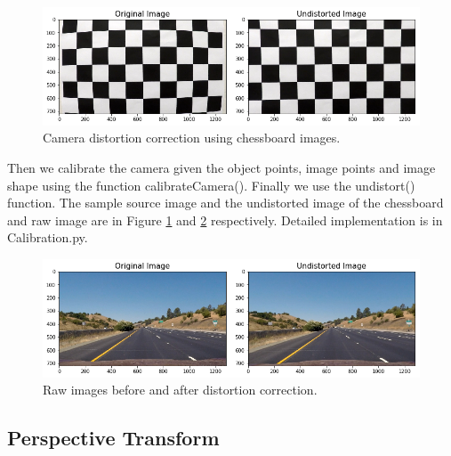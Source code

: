 \documentclass[12pt,twoside]{article}
\begin{document}
\begin{figure}[H]
	\begin{center}
		\includegraphics[width = 1.0\hsize]{./figures/Calibration.png} 
		\caption{Camera distortion correction using chessboard images.} %
		\label{fig:chessboard} %
	\end{center}
\end{figure}

Then we calibrate the camera given the object points, image points and image shape using the function calibrateCamera(). Finally we use the undistort() function. The sample source image and the undistorted image of the chessboard and raw image are in Figure \ref{fig:chessboard} and \ref{fig:cameraundistort} respectively. Detailed implementation is in Calibration.py.

\begin{figure}[H]
	\begin{center}
		\includegraphics[width = 1.0\hsize]{./figures/Undistorted.png} 
		\caption{Raw images before and after distortion correction.} %
		\label{fig:cameraundistort} %
	\end{center}
\end{figure}


\subsection{Perspective Transform}
\end{document}
